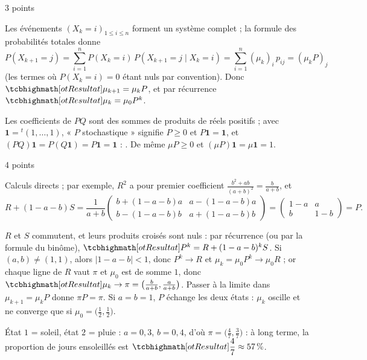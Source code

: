 
\enParties

\begin{corrigeEval}[Généralités]{3 points}{}
\begin{questions}
  \item Les événements $(X_k=i)_{1\leqslant i\leqslant n}$ forment un
    système complet ; la formule des probabilités totales donne
    \[P(X_{k+1}=j)=\sum_{i=1}^{n}P(X_k=i)\,P(X_{k+1}=j\mid X_k=i)=\sum_{i=1}^{n}(\mu_k)_i\,p_{ij}=(\mu_kP)_j\]
    (les termes où $P(X_k=i)=0$ étant nuls par convention). Donc
    $\res{\mu_{k+1}=\mu_kP}$, et par récurrence $\res{\mu_k=\mu_0P^{k}}$.
  \item Les coefficients de $PQ$ sont des sommes de produits de réels
    positifs ; avec $\mathbf{1}={}^{t}(1,\dots,1)$, « $P$ stochastique »
    signifie $P\geqslant0$ et $P\mathbf{1}=\mathbf{1}$, et
    $(PQ)\mathbf{1}=P(Q\mathbf{1})=P\mathbf{1}=\mathbf{1}$ :
    . De même $\mu P\geqslant0$ et
    $(\mu P)\mathbf{1}=\mu\mathbf{1}=1$. 
\end{questions}
\end{corrigeEval}

\begin{corrigeEval}{4 points}{}
\begin{questions}[start=3]
  \item Calculs directs ; par exemple, $R^{2}$ a pour premier coefficient
    $\frac{b^{2}+ab}{(a+b)^{2}}=\frac{b}{a+b}$, et
    \[R+(1-a-b)S=\frac{1}{a+b}\begin{pmatrix}b+(1-a-b)a&a-(1-a-b)a\\b-(1-a-b)b&a+(1-a-b)b\end{pmatrix}
      =\begin{pmatrix}1-a&a\\b&1-b\end{pmatrix}=P.\]
    \pts{1 pt}
  \item $R$ et $S$ commutent, et leurs produits croisés sont nuls : par
    récurrence (ou par la formule du binôme),
    $\res{P^{k}=R+(1-a-b)^{k}S}$. Si $(a,b)\neq(1,1)$, alors
    $|1-a-b|<1$, donc $P^{k}\to R$ et $\mu_k=\mu_0P^{k}\to\mu_0R$ ; or
    chaque ligne de $R$ vaut $\pi$ et $\mu_0$ est de somme $1$, donc
    $\res{\mu_k\to\pi=\bigl(\tfrac{b}{a+b},\tfrac{a}{a+b}\bigr)}$. Passer à la
    limite dans $\mu_{k+1}=\mu_kP$ donne $\pi P=\pi$. Si $a=b=1$, $P$ échange
    les deux états : $\mu_k$ oscille et ne converge que si
    $\mu_0=\bigl(\frac12,\frac12\bigr)$. 
  \item État $1$ = soleil, état $2$ = pluie : $a=0{,}3$, $b=0{,}4$, d'où
    $\pi=\bigl(\frac47,\frac37\bigr)$ : à long terme, la proportion de jours
    ensoleillés est $\res{\dfrac47\approx57\,\%}$. \pts{1 pt}
\end{questions}
\end{corrigeEval}

